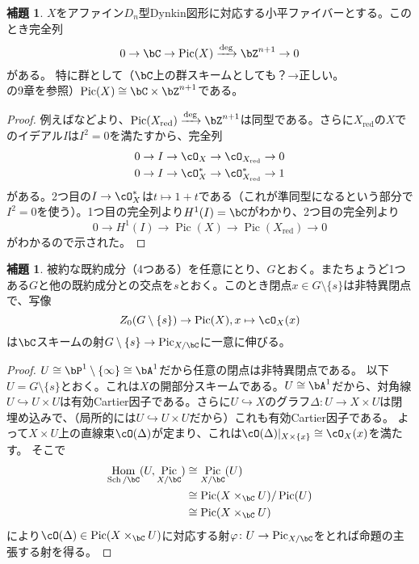 \documentclass[uplatex, a4paper, dvipdfmx]{jsarticle}
\theoremstyle{definition}
\newtheorem{lemma}[theorem]{補題}
\DeclareMathOperator{\Hom}{\mathrm{Hom}}
\DeclareMathOperator{\Pic}{\mathrm{Pic}}
\DeclareMathOperator{\red}{\mathrm{red}}
\DeclareMathOperator{\Sch}{\mathrm{Sch}}
\begin{document}
\begin{lemma}\label{lem:picard-group-of-type-d}
    $X$をアファイン$D_n$型Dynkin図形に対応する小平ファイバーとする。このとき完全列
    \begin{equation}
        0 \to \bC \to \Pic(X) \xrightarrow{\deg} \bZ^{n+1} \to 0
    \end{equation}
    がある。
    特に群として（$\bC$上の群スキームとしても？→正しい。\cite{MR1045822}の9章を参照）$\Pic(X) \cong \bC \times \bZ^{n+1}$である。
\end{lemma}
\begin{proof}
    例えば\cite{MR3713873}などより、$\Pic(X_{\red})  \xrightarrow{\deg} \bZ^{n+1}$は同型である。さらに$X_{\red}$の$X$でのイデアル$I$は$I^2 = 0$を満たすから、完全列
    \begin{align}
        0 \to I \to \cO_{X} \to \cO_{X_{\red}} \to 0 \\
        0 \to I \to \cO_{X}^* \to \cO_{X_{\red}}^* \to 1
    \end{align}
    がある。2つ目の$I \to \cO_{X}^*$は$t \mapsto 1 + t$である（これが準同型になるという部分で$I^2=0$を使う）。1つ目の完全列より$H^1(I) = \bC$がわかり、2つ目の完全列より
    \begin{equation}
        0 \to H^1(I) \to \Pic(X) \to \Pic(X_{\red}) \to 0
    \end{equation}
    がわかるので示された。
\end{proof}
\begin{lemma}\label{lem:morphism-to-picard-group-scheme}
    被約な既約成分（4つある）を任意にとり、$G$とおく。またちょうど1つある$G$と他の既約成分との交点を$s$とおく。このとき閉点$x \in G \setminus \{s\}$は非特異閉点で、写像
    \begin{equation}
        Z_0(G \setminus \{s\}) \to \Pic(X), x \mapsto \cO_X(x)
    \end{equation}
    は$\bC$スキームの射$G \setminus \{s\} \to \Pic_{X/\bC}$に一意に伸びる。
\end{lemma}
\begin{proof}
    $U \cong \bP^1 \setminus\{\infty\} \cong \bA^1$だから任意の閉点は非特異閉点である。
    以下$U = G \setminus \{s\}$とおく。これは$X$の開部分スキームである。$U \cong \bA^1$だから、対角線$U \hookrightarrow U \times U$は有効Cartier因子である。さらに$U \hookrightarrow X$のグラフ$\Delta \colon U \to X \times U$は閉埋め込みで、（局所的には$U \hookrightarrow U \times U$だから）これも有効Cartier因子である。
    よって$X \times U$上の直線束$\cO(\Delta)$が定まり、これは$\cO(\Delta)\vert_{X \times \{x\}} \cong \cO_X(x)$を満たす。
    そこで
    \begin{align}
        \Hom_{\Sch/\bC}(U, \Pic_{X/\bC}) & \cong \Pic_{X /\bC}(U)               \\
                                         & \cong \Pic(X \times_{\bC} U)/\Pic(U) \\
                                         & \cong \Pic(X \times_{\bC} U)
    \end{align}
    により$\cO(\Delta) \in \Pic(X \times_{\bC} U)$に対応する射$\varphi \colon U \to \Pic_{X/\bC}$をとれば命題の主張する射を得る。
\end{proof}
\end{document}
